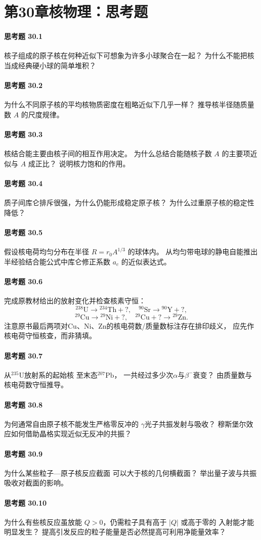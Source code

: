 \section*{第30章\quad 核物理：思考题}
\paragraph{思考题 30.1}
核子组成的原子核在何种近似下可想象为许多小球聚合在一起？
为什么不能把核当成经典硬小球的简单堆积？
\paragraph{思考题 30.2}
为什么不同原子核的平均核物质密度在粗略近似下几乎一样？
推导核半径随质量数 \(A\) 的尺度规律。
\paragraph{思考题 30.3}
核结合能主要由核子间的相互作用决定。
为什么总结合能随核子数 \(A\) 的主要项近似与 \(A\) 成正比？
说明核力饱和的作用。
\paragraph{思考题 30.4}
质子间库仑排斥很强，为什么仍能形成稳定原子核？
为什么过重原子核的稳定性降低？
\paragraph{思考题 30.5}
假设核电荷均匀分布在半径
\(R=r_0A^{1/3}\) 的球体内。
从均匀带电球的静电自能推出
半经验结合能公式中库仑修正系数 \(a_c\) 的近似表达式。
\paragraph{思考题 30.6}
完成原教材给出的放射变化并检查核素守恒：
\[
{}^{238}\mathrm U\to{}^{234}\mathrm{Th}+?,
\quad
{}^{90}\mathrm{Sr}\to{}^{90}\mathrm Y+?,
\]
\[
{}^{29}\mathrm{Cu}\to{}^{29}\mathrm{Ni}+?,
\quad
{}^{29}\mathrm{Cu}+?\to{}^{29}\mathrm{Zn}.
\]
注意原书最后两项对Cu、Ni、Zn的核电荷数/质量数标注存在排印歧义，
应先作核电荷守恒核查，而非猜填。
\paragraph{思考题 30.7}
从\({}^{235}\mathrm U\)放射系的起始核
至末态\({}^{207}\mathrm{Pb}\)，
一共经过多少次\(\alpha\)与\(\beta^-\)衰变？
由质量数与核电荷数守恒推导。
\paragraph{思考题 30.8}
为何通常自由原子核不能发生严格零反冲的
\(\gamma\)光子共振发射与吸收？
穆斯堡尔效应如何借助晶格实现近似无反冲的共振？
\paragraph{思考题 30.9}
为什么某些粒子—原子核反应截面
可以大于核的几何横截面？
举出量子波与共振吸收对截面的影响。
\paragraph{思考题 30.10}
为什么有些核反应虽放能
\(Q>0\)，仍需粒子具有高于 \(|Q|\) 或高于零的
入射能才能明显发生？
提高引发反应的粒子能量是否必然提高可利用净能量效率？
